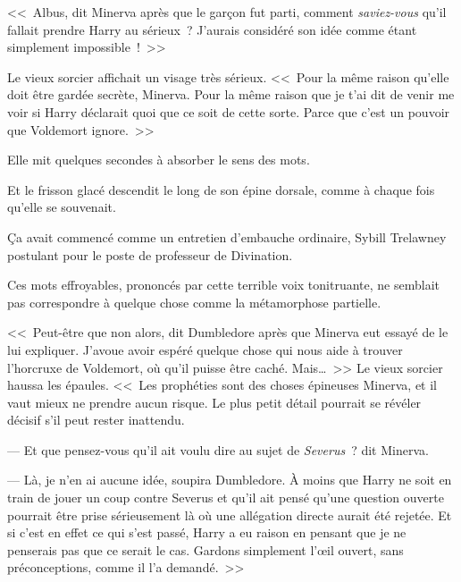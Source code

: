 \later

<<~Albus, dit Minerva après que le garçon fut parti, comment \emph{saviez-vous} qu'il fallait prendre Harry au sérieux~? J'aurais considéré son idée comme étant simplement impossible~!~>>

Le vieux sorcier affichait un visage très sérieux. <<~Pour la même raison qu'elle doit être gardée secrète, Minerva. Pour la même raison que je t'ai dit de venir me voir si Harry déclarait quoi que ce soit de cette sorte. Parce que c'est un pouvoir que Voldemort ignore.~>>

Elle mit quelques secondes à absorber le sens des mots.

Et le frisson glacé descendit le long de son épine dorsale, comme à chaque fois qu'elle se souvenait.

Ça avait commencé comme un entretien d'embauche ordinaire, Sybill Trelawney postulant pour le poste de professeur de Divination.


Ces mots effroyables, prononcés par cette terrible voix tonitruante, ne semblait pas correspondre à quelque chose comme la métamorphose partielle.

<<~Peut-être que non alors, dit Dumbledore après que Minerva eut essayé de le lui expliquer. J'avoue avoir espéré quelque chose qui nous aide à trouver l'horcruxe de Voldemort, où qu'il puisse être caché. Mais…~>> Le vieux sorcier haussa les épaules. <<~Les prophéties sont des choses épineuses Minerva, et il vaut mieux ne prendre aucun risque. Le plus petit détail pourrait se révéler décisif s'il peut rester inattendu.

--- Et que pensez-vous qu'il ait voulu dire au sujet de \emph{Severus}~? dit Minerva.

--- Là, je n'en ai aucune idée, soupira Dumbledore. À moins que Harry ne soit en train de jouer un coup contre Severus et qu'il ait pensé qu'une question ouverte pourrait être prise sérieusement là où une allégation directe aurait été rejetée. Et si c'est en effet ce qui s'est passé, Harry a eu raison en pensant que je ne penserais pas que ce serait le cas. Gardons simplement l'œil ouvert, sans préconceptions, comme il l'a demandé.~>>

